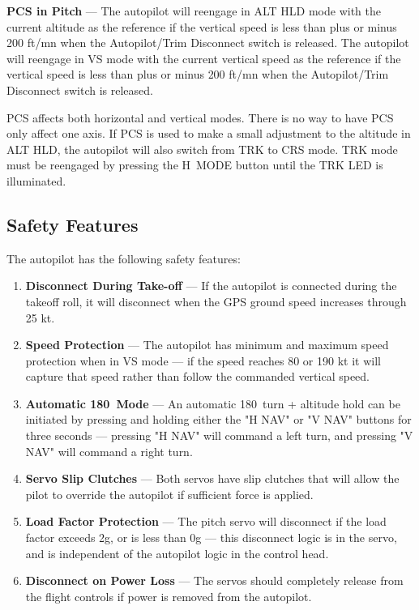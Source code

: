 \textbf{PCS in Pitch} --- The autopilot will reengage in ALT HLD mode with the current altitude as the reference if the vertical speed is less than plus or minus 200 ft/mn when the Autopilot/Trim Disconnect switch is released. The autopilot will reengage in VS mode with the current vertical speed as the reference if the vertical speed is less than plus or minus 200 ft/mn when the Autopilot/Trim Disconnect switch is released. 

\begin{Note}
PCS affects both horizontal and vertical modes. There is no way to have PCS only affect one axis. If PCS is used to make a small adjustment to the altitude in ALT HLD, the autopilot will also switch from TRK to CRS mode. TRK mode must be reengaged by pressing the H~MODE button until the TRK LED is illuminated.
\end{Note}

\subsection*{Safety Features}
The autopilot has the following safety features:

\begin{enumerate}
\item \textbf{Disconnect During Take-off} --- If the autopilot is connected during the takeoff roll, it will disconnect when the GPS ground speed increases through 25 kt. 
\item \textbf{Speed Protection} --- The autopilot has minimum and maximum speed protection when in VS mode --- if the speed reaches 80 or 190 kt it will capture that speed rather than follow the commanded vertical speed. 
\item \textbf{Automatic 180\textdegree \ Mode} --- An automatic 180\textdegree \ turn + altitude hold can be initiated by pressing and holding either the "H NAV" or "V NAV" buttons for three seconds --- pressing "H NAV" will command a left turn, and pressing "V NAV" will command a right turn.
\item \textbf{Servo Slip Clutches} --- Both servos have slip clutches that will allow the pilot to override the autopilot if sufficient force is applied. 
\item \textbf{Load Factor Protection} --- The pitch servo will disconnect if the load factor exceeds 2g, or is less than 0g --- this disconnect logic is in the servo, and is independent of the autopilot logic in the control head. 
\item \textbf{Disconnect on Power Loss} --- The servos should completely release from the flight controls if power is removed from the autopilot.
\end{enumerate}

